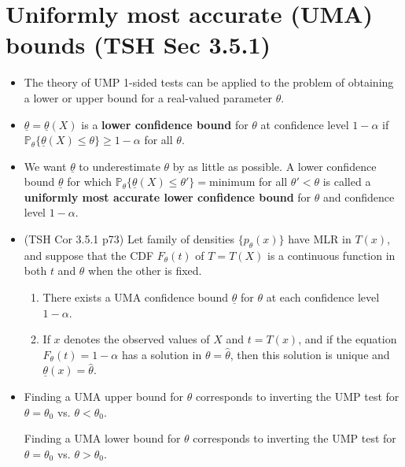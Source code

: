 \documentclass[twoside]{article}
\newcommand\bbP{\mathbb{P}}
\def\t{\theta}
\begin{document}
\section*{Uniformly most accurate (UMA) bounds (TSH Sec 3.5.1)}
\begin{itemize}
\item The theory of UMP 1-sided tests can be applied to the problem of obtaining a lower or upper bound for a real-valued parameter $\t$.

\item $\underline{\t} = \underline{\t}(X)$ is a \textbf{lower confidence bound} for $\t$ at confidence level $1 - \alpha$ if $\bbP_\t \{ \underline{\t}(X) \leq \t \} \geq 1 - \alpha$ for all $\t$.

\item We want $\underline{\t}$ to underestimate $\t$ by as little as possible. A lower confidence bound $\underline{\t}$ for which $\bbP_\t \{ \underline{\t}(X) \leq \t' \} = \text{minimum}$ for all $\t' < \t$ is called a \textbf{uniformly most accurate lower confidence bound} for $\t$ and confidence level $1 - \alpha$.

\item (TSH Cor 3.5.1 p73) Let family of densities $\{ p_\t(x) \}$ have MLR in $T(x)$, and suppose that the CDF $F_\t(t)$ of $T = T(X)$ is a continuous function in both $t$ and $\t$ when the other is fixed.
\begin{enumerate}
\item There exists a UMA confidence bound $\underline{\t}$ for $\t$ at each confidence level $1 - \alpha$.
\item If $x$ denotes the observed values of $X$ and $t = T(x)$, and if the equation $F_\t (t) = 1 - \alpha$ has a solution in $\t = \hat{\t}$, then this solution is unique and $\underline{\t}(x) = \hat{\t}$.
\end{enumerate}

\item Finding a UMA upper bound for $\t$ corresponds to inverting the UMP test for $\t = \t_0$ vs. $\t < \t_0$.

Finding a UMA lower bound for $\t$ corresponds to inverting the UMP test for $\t = \t_0$ vs. $\t > \t_0$.
\end{itemize}
\end{document}

